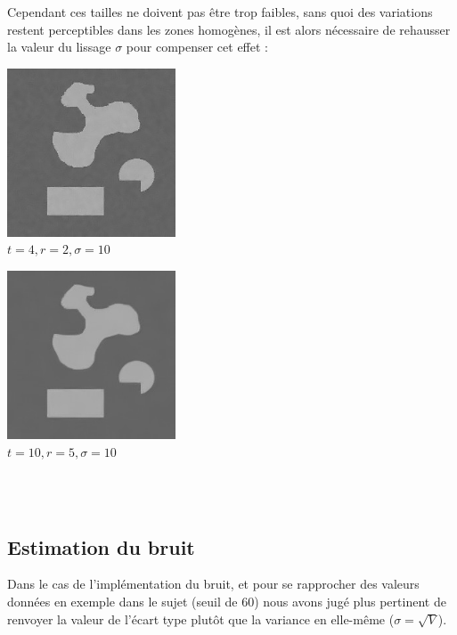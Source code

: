 \documentclass[a4,12pt]{article}
\begin{document}
Cependant ces tailles ne doivent pas être trop faibles, sans quoi des variations restent perceptibles dans les zones homogènes, il est alors nécessaire de rehausser la valeur du lissage $\sigma$ pour compenser cet effet :\\

\noindent
\begin{minipage}[c]{0.50\linewidth}
	\begin{center}
		\includegraphics[width = 50mm]{./img/nltroppetit4-2-10.jpg}\\
		\textit{$t=4, r=2, \sigma=10$}\\
	\end{center}
\end{minipage}
\begin{minipage}[c]{0.50\linewidth}
	\begin{center}
		\includegraphics[width = 50mm]{./img/nlassezgrand10-5-10.jpg}\\
		\textit{$t=10, r=5, \sigma=10$}\\
	\end{center}
\end{minipage}\\
\\
\subsection{Estimation du bruit}
Dans le cas de l'implémentation du bruit, et pour se rapprocher des valeurs données en exemple dans le sujet (seuil de 60) nous avons jugé plus pertinent de renvoyer la valeur de l'écart type plutôt que la variance en elle-même ($\sigma = \sqrt{V}$).
\end{document}
